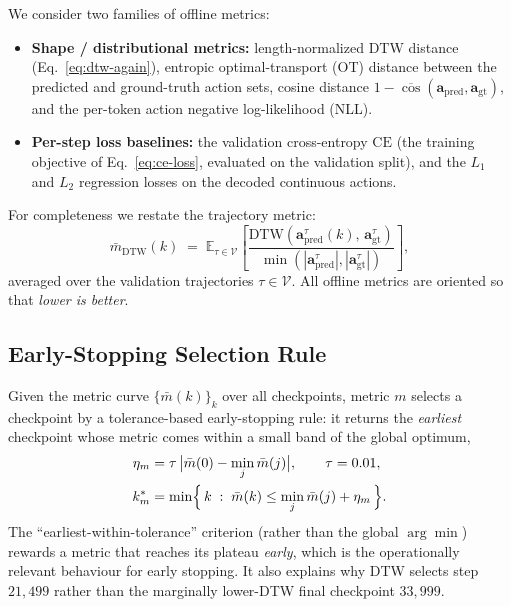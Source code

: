 We consider two families of offline metrics:
\begin{itemize}
  \item \textbf{Shape / distributional metrics:} length-normalized DTW distance
  (Eq.~\ref{eq:dtw-again}), entropic optimal-transport (OT) distance between the
  predicted and ground-truth action sets, cosine distance
  $1-\overline{\cos}(\mathbf a_{\mathrm{pred}},\mathbf a_{\mathrm{gt}})$, and the
  per-token action negative log-likelihood (NLL).
  \item \textbf{Per-step loss baselines:} the validation cross-entropy
  $\mathrm{CE}$ (the training objective of Eq.~\ref{eq:ce-loss}, evaluated on the
  validation split), and the $L_1$ and $L_2$ regression losses on the decoded
  continuous actions.
\end{itemize}
For completeness we restate the trajectory metric:
\begin{equation}
\label{eq:dtw-again}
\bar m_{\mathrm{DTW}}(k) \;=\; \mathbb{E}_{\tau\in\mathcal{V}}
\!\left[\frac{\mathrm{DTW}\!\left(\mathbf a^{\tau}_{\mathrm{pred}}(k),\,
\mathbf a^{\tau}_{\mathrm{gt}}\right)}{\min\!\left(|\mathbf a^{\tau}_{\mathrm{pred}}|,
|\mathbf a^{\tau}_{\mathrm{gt}}|\right)}\right],
\end{equation}
averaged over the validation trajectories $\tau\in\mathcal{V}$. All offline metrics
are oriented so that \emph{lower is better}.

\subsection{Early-Stopping Selection Rule}

Given the metric curve $\{\bar m(k)\}_{k}$ over all checkpoints, metric $m$ selects a
checkpoint by a tolerance-based early-stopping rule: it returns the \emph{earliest}
checkpoint whose metric comes within a small band of the global optimum,
\begin{align}
\eta_m &= \tau\,\bigl|\bar m(0) - \min_j \bar m(j)\bigr|, \qquad \tau = 0.01, \\
k^*_m &= \min\Bigl\{\,k \;:\; \bar m(k) \le \min_j \bar m(j) + \eta_m \,\Bigr\}.
\label{eq:earlystop}
\end{align}
The ``earliest-within-tolerance'' criterion (rather than the global $\arg\min$)
rewards a metric that reaches its plateau \emph{early}, which is the operationally
relevant behaviour for early stopping. It also explains why DTW selects step
$21{,}499$ rather than the marginally lower-DTW final checkpoint $33{,}999$.

